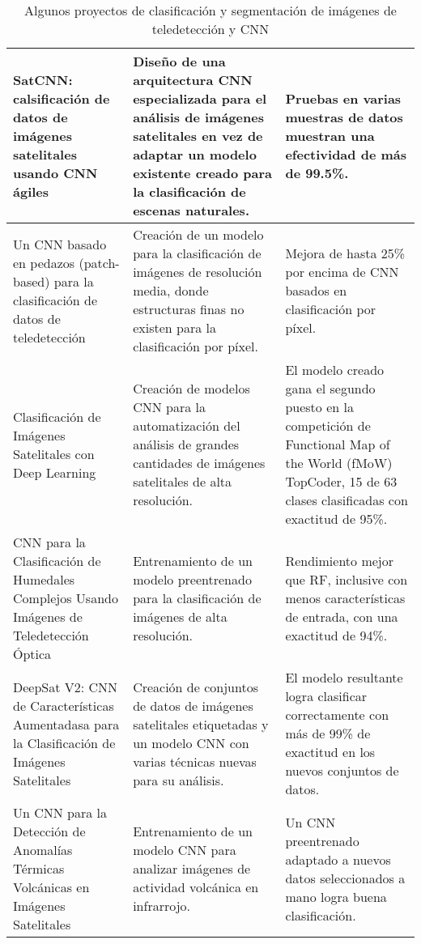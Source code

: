 \begin{center}
\begin{table}[h!]
\begin{tabular}{|m{4cm}|m{5cm}|m{6.2cm}|}
            SatCNN: calsificación de datos de imágenes satelitales usando CNN ágiles \autocite{zhong-2016} & Diseño de
            una arquitectura CNN especializada para el análisis de imágenes satelitales en vez de adaptar un modelo
            existente creado para la clasificación de escenas naturales. & Pruebas en varias muestras de datos muestran
            una efectividad de más de 99.5\%. \\
            \hline
            Un CNN basado en pedazos (patch-based) para la clasificación de datos de teledetección
            \autocite{sharma-2017} & Creación de un modelo para la clasificación de imágenes de resolución media, donde
            estructuras finas no existen para la clasificación por píxel. & Mejora de hasta 25\% por encima de CNN
            basados en clasificación por píxel. \\
            \hline
            Clasificación de Imágenes Satelitales con Deep Learning \autocite{pritt-2017} & Creación de modelos CNN
            para la automatización del análisis de grandes cantidades de imágenes satelitales de alta resolución. & El
            modelo creado gana el segundo puesto en la competición de Functional Map of the World (fMoW) TopCoder, 15
            de 63 clases clasificadas con exactitud de 95\%. \\
            \hline
            CNN para la Clasificación de Humedales Complejos Usando Imágenes de Teledetección Óptica
            \autocite{rezaee-2018} & Entrenamiento de un modelo preentrenado para la clasificación de imágenes de alta
            resolución. & Rendimiento mejor que RF, inclusive con menos características de entrada, con una exactitud
            de 94\%. \\
            \hline
            DeepSat V2: CNN de Características Aumentadasa para la Clasificación de Imágenes Satelitales
            \autocite{liu-2019} & Creación de conjuntos de datos de imágenes satelitales etiquetadas y un modelo CNN
            con varias técnicas nuevas para su análisis. & El modelo resultante logra clasificar correctamente con más
            de 99\% de exactitud en los nuevos conjuntos de datos. \\
            \hline
            Un CNN para la Detección de Anomalías Térmicas Volcánicas en Imágenes Satelitales \autocite{amato-2023} &
            Entrenamiento de un modelo CNN para analizar imágenes de actividad volcánica en infrarrojo. & Un CNN
            preentrenado adaptado a nuevos datos seleccionados a mano logra buena clasificación. \\
            \hline
        \end{tabular}
        \caption{Algunos proyectos de clasificación y segmentación de imágenes de teledetección y CNN}
        \label{table:1}
    \end{table}
\end{center}

